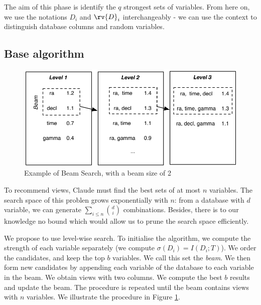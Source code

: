 The aim of this phase is identify the $q$ strongest sets of variables. From
here on, we use the notations $D_i$ and $\rv{D}_i$ interchangeably - we can use
the context to distinguish database columns and random variables.

\subsection{Base algorithm}

\begin{figure}[t!]
\centering
\includegraphics[width=0.8\columnwidth]{images/beam-search}
\caption{Example of Beam Search, with a beam size of 2}
\label{pic:beam-search}
\end{figure}

To recommend views, Claude must find the best sets of at most $n$ variables.
The search space of this problen grows exponentially with $n$: from a database
with $d$ variable, we can generate $\sum_{i \leq n} \binom{d}{i}$ combinations.
Besides, there is to our knowledge no bound which would allow us to prune the
search space efficiently. 

We propose to use level-wise search. To initialise the algorithm, we compute
the strength of each variable separately (we compute $\sigma(D_i) = I(D_i;
T)$). We order the candidates, and keep the top $b$ variables. We call this set
the \emph{beam}. We then form new candidates by appending each variable of the
database to each variable in the beam. We obtain views with two columns. We
compute the best $b$ results and update the beam. The procedure is repeated
until the beam contains views with $n$ variables. We illustrate the procedure
in Figure \ref{pic:beam-search}.

